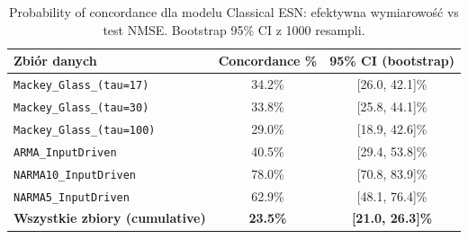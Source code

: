 \begin{table}[ht]
\centering
\caption{Probability of concordance dla modelu Classical ESN: efektywna wymiarowość vs test NMSE. Bootstrap 95\% CI z 1000 resampli.}
\label{tab:concordance-classical_esn}
\begin{tabular}{lcc}
\toprule
Zbiór danych & Concordance \% & 95\% CI (bootstrap) \\
\midrule
\texttt{Mackey\_Glass\_(tau=17)} & 34.2\% & [26.0, 42.1]\% \\
\texttt{Mackey\_Glass\_(tau=30)} & 33.8\% & [25.8, 44.1]\% \\
\texttt{Mackey\_Glass\_(tau=100)} & 29.0\% & [18.9, 42.6]\% \\
\texttt{ARMA\_InputDriven} & 40.5\% & [29.4, 53.8]\% \\
\texttt{NARMA10\_InputDriven} & 78.0\% & [70.8, 83.9]\% \\
\texttt{NARMA5\_InputDriven} & 62.9\% & [48.1, 76.4]\% \\
\midrule
\textbf{Wszystkie zbiory (cumulative)} & \textbf{23.5\%} & \textbf{[21.0, 26.3]\%} \\
\bottomrule
\end{tabular}
\end{table}